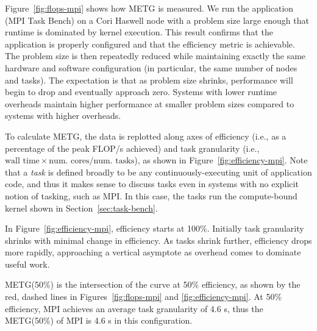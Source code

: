 


Figure~\ref{fig:flops-mpi} shows how METG is
measured. We run the application (MPI Task Bench) on a Cori Haswell node
with a problem size large enough that runtime is dominated by kernel
execution. This result confirms
that the application is properly configured and that the
efficiency metric is achievable. The problem
size is then repeatedly reduced while maintaining exactly the same hardware and software
configuration (in particular, the same number of nodes and tasks). The
expectation is that as problem size shrinks,
performance will begin to drop and eventually approach zero. Systems
with lower runtime overheads maintain higher performance at smaller
problem sizes compared to systems with higher overheads.

To calculate METG, the data is replotted along axes of efficiency
(i.e., as a percentage of the peak FLOP/s achieved) and task
granularity (i.e., $\text{wall time} \times \text{num.~cores}/\text{num.~tasks}$), as shown in Figure~\ref{fig:efficiency-mpi}. Note that a \emph{task} is defined
broadly to be any continuously-executing unit of application code,
and thus it makes sense to discuss tasks even in systems
with no explicit notion of tasking, such as MPI. In this case, the
tasks run the compute-bound kernel shown in
Section~\ref{sec:task-bench}.

In Figure~\ref{fig:efficiency-mpi},
efficiency starts at 100\%. Initially task granularity
shrinks with minimal change in efficiency. As tasks shrink further, efficiency drops more rapidly, approaching a vertical asymptote as overhead comes to dominate useful work.


METG(50\%) is the intersection of the curve at 50\% efficiency, as
shown by the red, dashed lines in Figures~\ref{fig:flops-mpi} and
\ref{fig:efficiency-mpi}. At 50\% efficiency, MPI achieves an average
task granularity of
4.6 \textmu{}s, thus the METG(50\%) of MPI is 4.6 \textmu{}s in this
configuration. %

